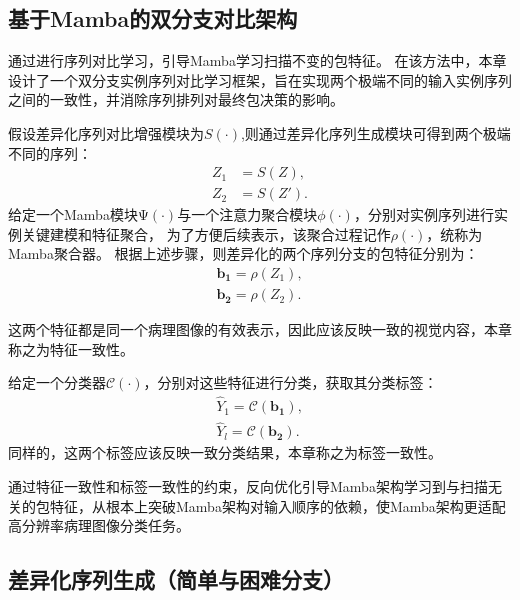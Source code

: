 \subsection[\hspace{-2pt}基于Mamba的双分支对比架构]{{\heiti{} \hspace{-8pt}基于Mamba的双分支对比架构}}\label{section4: 基于Mamba的双分支对比架构}

通过进行序列对比学习，引导Mamba学习扫描不变的包特征。
在该方法中，本章设计了一个双分支实例序列对比学习框架，旨在实现两个极端不同的输入实例序列之间的一致性，并消除序列排列对最终包决策的影响。

假设差异化序列对比增强模块为$S(\cdot)$,则通过差异化序列生成模块可得到两个极端不同的序列：
\begin{equation}
  \begin{aligned} 
    Z_1&=S(Z),\\
    Z_2&=S(Z').
\end{aligned}
\end{equation}
给定一个Mamba模块$\mathrm{\Psi}\left(\cdot\right)$与一个注意力聚合模块$\phi\left(\cdot\right)$，分别对实例序列进行实例关键建模和特征聚合，
为了方便后续表示，该聚合过程记作$\rho\left(\cdot\right)$，统称为Mamba聚合器。
根据上述步骤，则差异化的两个序列分支的包特征分别为：
\begin{equation}
  \begin{aligned} 
  \mathbf{b_1}=\rho(Z_1),\\
  \mathbf{b_2}=\rho(Z_2).
\end{aligned}
\end{equation}

这两个特征都是同一个病理图像的有效表示，因此应该反映一致的视觉内容，本章称之为特征一致性。

给定一个分类器$\mathcal{C}(\cdot)$，分别对这些特征进行分类，获取其分类标签：
\begin{equation}
  \begin{aligned} 
    {\hat{Y}}_1=\mathcal{C}(\mathbf{b_1}),\\
    {\hat{Y}}_l=\mathcal{C}(\mathbf{b_2}).
\end{aligned}
\end{equation}
同样的，这两个标签应该反映一致分类结果，本章称之为标签一致性。

通过特征一致性和标签一致性的约束，反向优化引导Mamba架构学习到与扫描无关的包特征，从根本上突破Mamba架构对输入顺序的依赖，使Mamba架构更适配高分辨率病理图像分类任务。

\subsection[\hspace{-2pt}差异化序列生成（简单与困难分支）]{{\heiti{} \hspace{-8pt}差异化序列生成（简单与困难分支）}}\label{section4: 差异化序列生成（简单与困难分支）}

